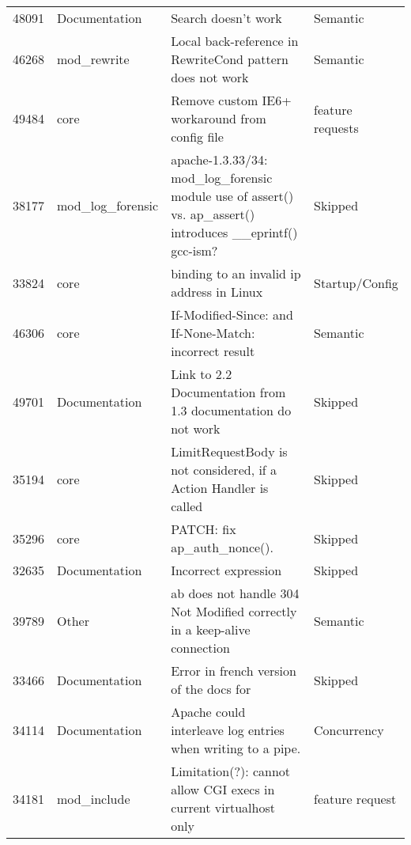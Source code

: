 \begin{longtable}[c]{llll}
48091  & Documentation      & Search doesn't work                                                                                            & Semantic          \\
46268  & mod\_rewrite       & Local back-reference in RewriteCond pattern does not work                                                 & Semantic          \\
49484  & core               & Remove custom IE6+ workaround from config file                                                                 & feature requests  \\
38177  & mod\_log\_forensic & apache-1.3.33/34: mod\_log\_forensic module use of assert() vs. ap\_assert() introduces \_\_eprintf() gcc-ism? & Skipped           \\
33824  & core               & binding to an invalid ip address in Linux                                                                      & Startup/Config    \\
46306  & core               & If-Modified-Since: and If-None-Match: incorrect result                                                         & Semantic          \\
49701  & Documentation      & Link to 2.2 Documentation from 1.3 documentation do not work                                                   & Skipped           \\
35194  & core               & LimitRequestBody is not considered, if a Action Handler is called                                              & Skipped           \\
35296  & core               & PATCH: fix ap\_auth\_nonce().                                                                                  & Skipped           \\
32635  & Documentation      & Incorrect expression & Skipped           \\
39789  & Other              & ab does not handle 304 Not Modified correctly in a keep-alive connection                                       & Semantic          \\
33466  & Documentation      & Error in french version of the docs for & Skipped           \\
34114  & Documentation      & Apache could interleave log entries when writing to a pipe.                                                    & Concurrency       \\
34181  & mod\_include       & Limitation(?): cannot allow CGI execs in current virtualhost only                                              & feature request   \\

\end{longtable}
